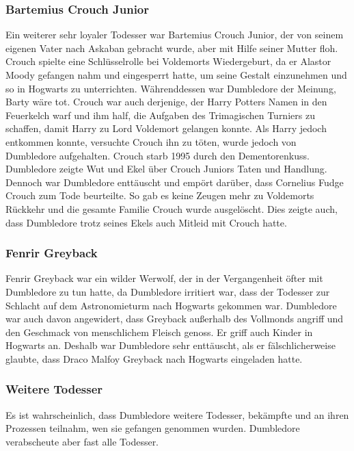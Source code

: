 \documentclass[a4paper, 10pt]{article}
\begin{document}
\subsubsection*{Bartemius Crouch Junior}
Ein weiterer sehr loyaler Todesser war Bartemius Crouch Junior, der von seinem eigenen Vater nach Askaban gebracht wurde, aber mit Hilfe seiner Mutter floh. Crouch spielte eine Schlüsselrolle bei Voldemorts Wiedergeburt, da er Alastor Moody gefangen nahm und eingesperrt hatte, um seine Gestalt einzunehmen und so in Hogwarts zu unterrichten. Währenddessen war Dumbledore der Meinung, Barty wäre tot. Crouch war auch derjenige, der Harry Potters Namen in den Feuerkelch warf und ihm half, die Aufgaben des Trimagischen Turniers zu schaffen, damit Harry zu Lord Voldemort gelangen konnte. Als Harry jedoch entkommen konnte, versuchte Crouch ihn zu töten, wurde jedoch von Dumbledore aufgehalten. Crouch starb 1995 durch den Dementorenkuss. Dumbledore zeigte Wut und Ekel über Crouch Juniors Taten und Handlung. Dennoch war Dumbledore enttäuscht und empört darüber, dass Cornelius Fudge Crouch zum Tode beurteilte. So gab es keine Zeugen mehr zu Voldemorts Rückkehr und die gesamte Familie Crouch wurde ausgelöscht. Dies zeigte auch, dass Dumbledore trotz seines Ekels auch Mitleid mit Crouch hatte.
\subsubsection*{Fenrir Greyback}
Fenrir Greyback war ein wilder Werwolf, der in der Vergangenheit öfter mit Dumbledore zu tun hatte, da Dumbledore irritiert war, dass der Todesser zur Schlacht auf dem Astronomieturm nach Hogwarts gekommen war. Dumbledore war auch davon angewidert, dass Greyback außerhalb des Vollmonds angriff und den Geschmack von menschlichem Fleisch genoss. Er griff auch Kinder in Hogwarts an. Deshalb war Dumbledore sehr enttäuscht, als er fälschlicherweise glaubte, dass Draco Malfoy Greyback nach Hogwarts eingeladen hatte.
\subsubsection*{Weitere Todesser}
Es ist wahrscheinlich, dass Dumbledore weitere Todesser, bekämpfte und an ihren Prozessen teilnahm, wen sie gefangen genommen wurden. Dumbledore verabscheute aber fast alle Todesser.
\end{document}
